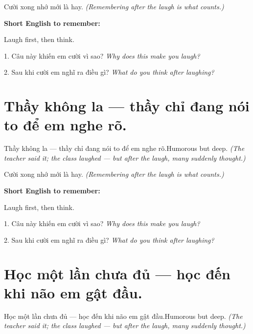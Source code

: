 \begin{baihoc}
Cười xong nhớ mới là hay.
\textit{(Remembering after the laugh is what counts.)}
\end{baihoc}

\begin{ghinhoanh}
\textbf{Short English to remember:}

Laugh first, then think.

\end{ghinhoanh}

\begin{tuhocnhanh}
1. Câu này khiến em cười vì sao? \textit{Why does this make you laugh?}

2. Sau khi cười em nghĩ ra điều gì? \textit{What do you think after laughing?}
\end{tuhocnhanh}
\ngancach


\section{Thầy không la — thầy chỉ đang nói to để em nghe rõ.}
\begin{truyen}{Thầy không la — thầy chỉ đang nói to để em nghe rõ.}{Humorous but deep.}
\textit{(The teacher said it; the class laughed — but after the laugh, many suddenly thought.)}
\end{truyen}

\begin{baihoc}
Cười xong nhớ mới là hay.
\textit{(Remembering after the laugh is what counts.)}
\end{baihoc}

\begin{ghinhoanh}
\textbf{Short English to remember:}

Laugh first, then think.

\end{ghinhoanh}

\begin{tuhocnhanh}
1. Câu này khiến em cười vì sao? \textit{Why does this make you laugh?}

2. Sau khi cười em nghĩ ra điều gì? \textit{What do you think after laughing?}
\end{tuhocnhanh}
\ngancach


\section{Học một lần chưa đủ — học đến khi não em gật đầu.}
\begin{truyen}{Học một lần chưa đủ — học đến khi não em gật đầu.}{Humorous but deep.}
\textit{(The teacher said it; the class laughed — but after the laugh, many suddenly thought.)}
\end{truyen}

